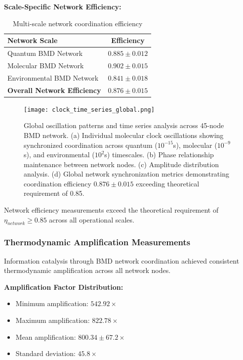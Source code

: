 \documentclass[12pt,a4paper]{article}
\begin{document}
\textbf{Scale-Specific Network Efficiency:}
\begin{table}[H]
\centering
\begin{tabular}{|l|c|}
\hline
\textbf{Network Scale} & \textbf{Efficiency} \\
\hline
Quantum BMD Network & $0.885 \pm 0.012$ \\
Molecular BMD Network & $0.902 \pm 0.015$ \\
Environmental BMD Network & $0.841 \pm 0.018$ \\
\hline
\textbf{Overall Network Efficiency} & \textbf{$0.876 \pm 0.015$} \\
\hline
\end{tabular}
\caption{Multi-scale network coordination efficiency}
\end{table}

\begin{figure}[H]
    \centering
    \texttt{[image: clock\_time\_series\_global.png]}
    \caption{Global oscillation patterns and time series analysis across 45-node BMD network. (a) Individual molecular clock oscillations showing synchronized coordination across quantum ($10^{-15}$s), molecular ($10^{-9}$s), and environmental ($10^2$s) timescales. (b) Phase relationship maintenance between network nodes. (c) Amplitude distribution analysis. (d) Global network synchronization metrics demonstrating coordination efficiency $0.876 \pm 0.015$ exceeding theoretical requirement of 0.85.}
    \label{fig:global_oscillations}
\end{figure}


Network efficiency measurements exceed the theoretical requirement of $\eta_{network} \geq 0.85$ across all operational scales.

\subsubsection{Thermodynamic Amplification Measurements}

Information catalysis through BMD network coordination achieved consistent thermodynamic amplification across all network nodes.

\textbf{Amplification Factor Distribution:}
\begin{itemize}
\item Minimum amplification: $542.92 \times$
\item Maximum amplification: $822.78 \times$ 
\item Mean amplification: $800.34 \pm 67.2 \times$
\item Standard deviation: $45.8 \times$
\end{itemize}
\end{document}
